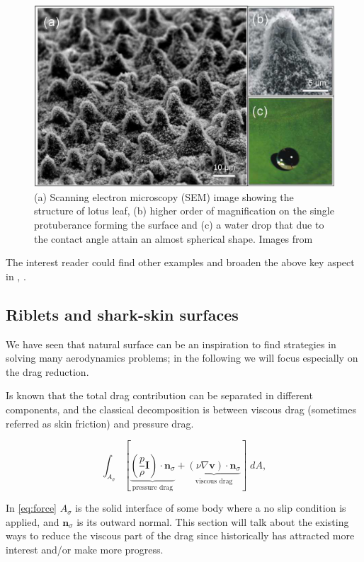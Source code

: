 \begin{figure}[h]
	\centering
	\includegraphics[width=0.6\linewidth]{chapter_1/lotus}
	\caption{(a) Scanning electron microscopy (SEM) image showing the structure of lotus leaf, (b) higher order of magnification on the single protuberance forming the surface and (c) a water drop that due to the contact angle attain an almost spherical shape. Images from \citet{stratakis2009laser}}
	\label{fig:lotus}
\end{figure}

The interest reader could find other examples and broaden the above key aspect in \citet{bhushan2016biomimetics}, \citet{tropea2012nature}.

\subsection{Riblets and shark-skin surfaces}

We have seen that natural surface can be an inspiration to find strategies in solving many aerodynamics problems; in the following we will focus especially on the drag reduction.

Is known that the total drag contribution can be separated in different components, and the classical decomposition is between viscous drag (sometimes referred as skin friction) and pressure drag.

\begin{equation}
 \int_{A_{\sigma}}  [ \underbrace{\left( \frac{p}{\rho} \mathbf{I} \right) \cdot  \mathbf{n}_{\sigma} }_\text{pressure drag}  +  \underbrace{ \left( \nu \nabla \mathbf{v} \right) \cdot  \mathbf{n}_{\sigma}}_\text{viscous drag} ] \; dA,
 \label{eq:force}
\end{equation}

In \eqref{eq:force} $A_{\sigma}$ is the solid interface of some body where a no slip condition is applied, and $ \mathbf{n}_{\sigma}$ is its outward normal.
This section will talk about the existing ways to reduce the viscous part of the drag since historically has attracted more interest and/or make more progress.

